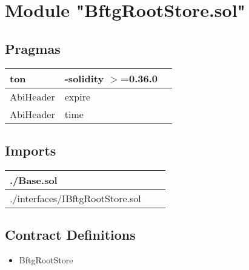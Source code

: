 
\section{Module "BftgRootStore.sol"}


\subsection{Pragmas}


\noindent\begin{tabular}{|l|l|p{5cm}|}\hline
ton & -solidity $>$=0.36.0 &\\\hline
AbiHeader &  expire &\\\hline
AbiHeader &  time &\\\hline
\end{tabular}


\subsection{Imports}


\noindent\begin{tabular}{|l|l|p{5cm}|}\hline
./Base.sol &\\\hline
./interfaces/IBftgRootStore.sol &\\\hline
\end{tabular}


\subsection{Contract Definitions}

\begin{itemize}
\item BftgRootStore
\end{itemize}
